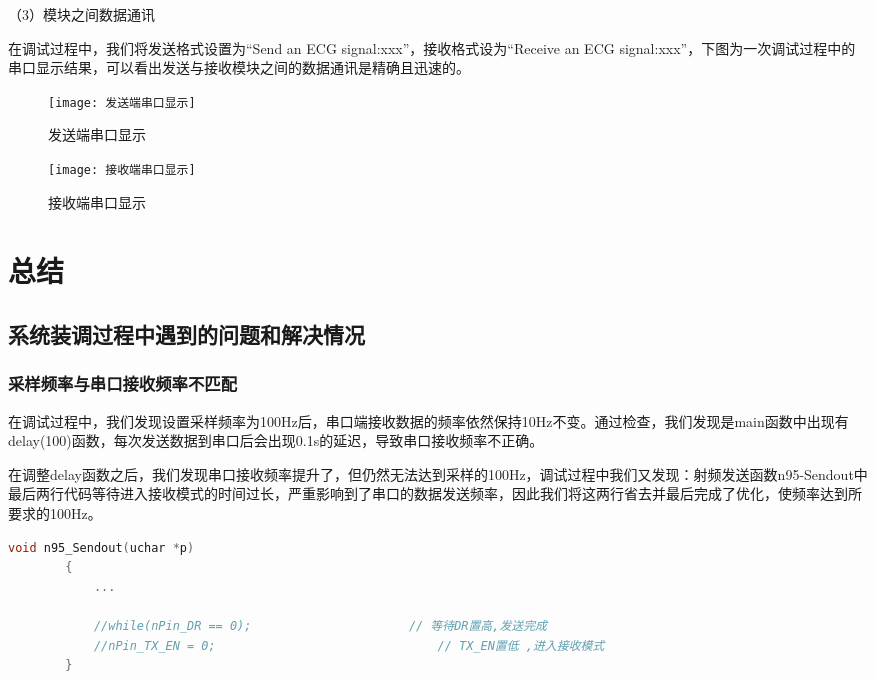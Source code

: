 \documentclass{zjureport}
\begin{document}
	               
	（3）模块之间数据通讯      
	
	在调试过程中，我们将发送格式设置为“Send an ECG signal:xxx”，接收格式设为“Receive an ECG signal:xxx”，下图为一次调试过程中的串口显示结果，可以看出发送与接收模块之间的数据通讯是精确且迅速的。
	
	\begin{figure}[H]
		\centering
		\begin{minipage}[t]{0.49\linewidth}%
			\texttt{[image: 发送端串口显示]}%
			\caption{发送端串口显示}
		\end{minipage}%
		\begin{minipage}[t]{0.49\linewidth}
			\texttt{[image: 接收端串口显示]}
			\caption{接收端串口显示}
		\end{minipage}
	\end{figure}
	
	\newpage
	
	\section{总结}
	
	\subsection{系统装调过程中遇到的问题和解决情况}
	
	\subsubsection{采样频率与串口接收频率不匹配}
	
	在调试过程中，我们发现设置采样频率为100Hz后，串口端接收数据的频率依然保持10Hz不变。通过检查，我们发现是main函数中出现有delay(100)函数，每次发送数据到串口后会出现0.1s的延迟，导致串口接收频率不正确。
	
	在调整delay函数之后，我们发现串口接收频率提升了，但仍然无法达到采样的100Hz，调试过程中我们又发现：射频发送函数n95-Sendout中最后两行代码等待进入接收模式的时间过长，严重影响到了串口的数据发送频率，因此我们将这两行省去并最后完成了优化，使频率达到所要求的100Hz。
	\begin{lstlisting}[language=C]
		void n95_Sendout(uchar *p)
		{
			...
			
			//while(nPin_DR == 0);						// 等待DR置高,发送完成
			//nPin_TX_EN = 0;								// TX_EN置低 ,进入接收模式
		}
	\end{lstlisting} 
	
	~\\
	
\end{document}
